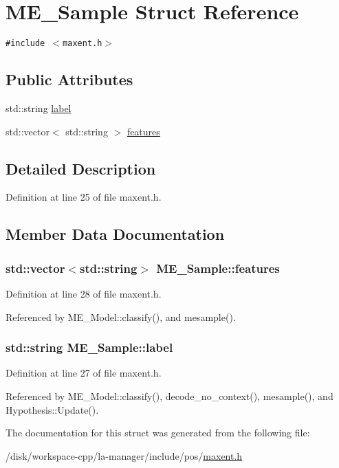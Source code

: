 \hypertarget{structME__Sample}{
\section{ME\_\-Sample Struct Reference}
\label{structME__Sample}
}
{\tt \#include $<$maxent.h$>$}

\subsection*{Public Attributes}
\begin{CompactItemize}
\item 
std::string \hyperlink{structME__Sample_65dd665de645a8a4ba7847b0ac42290d}{label}
\item 
std::vector$<$ std::string $>$ \hyperlink{structME__Sample_255f0355bcc704e37b36ad9ad31b378a}{features}
\end{CompactItemize}


\subsection{Detailed Description}


Definition at line 25 of file maxent.h.

\subsection{Member Data Documentation}
\hypertarget{structME__Sample_255f0355bcc704e37b36ad9ad31b378a}{
\subsubsection[{features}]{\setlength{\rightskip}{0pt plus 5cm}std::vector$<$std::string$>$ {\bf ME\_\-Sample::features}}}
\label{structME__Sample_255f0355bcc704e37b36ad9ad31b378a}




Definition at line 28 of file maxent.h.

Referenced by ME\_\-Model::classify(), and mesample().\hypertarget{structME__Sample_65dd665de645a8a4ba7847b0ac42290d}{
\subsubsection[{label}]{\setlength{\rightskip}{0pt plus 5cm}std::string {\bf ME\_\-Sample::label}}}
\label{structME__Sample_65dd665de645a8a4ba7847b0ac42290d}




Definition at line 27 of file maxent.h.

Referenced by ME\_\-Model::classify(), decode\_\-no\_\-context(), mesample(), and Hypothesis::Update().

The documentation for this struct was generated from the following file:\begin{CompactItemize}
\item 
/disk/workspace-cpp/la-manager/include/pos/\hyperlink{maxent_8h}{maxent.h}\end{CompactItemize}
